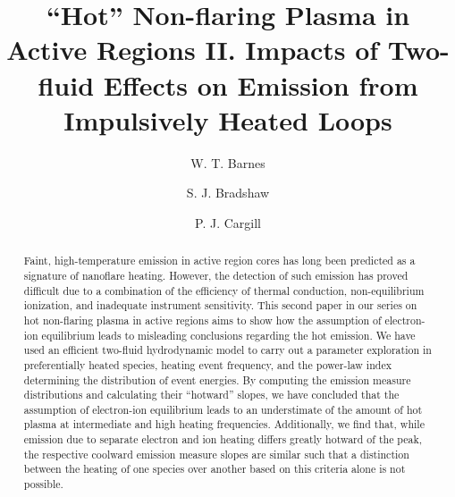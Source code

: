 \documentclass[apj]{emulateapj}
\begin{document}
	\title{``Hot'' Non-flaring Plasma in Active Regions II. Impacts of Two-fluid Effects on Emission from Impulsively Heated Loops}
	\author{W. T. Barnes}
	\author{S. J. Bradshaw}
	\author{P. J. Cargill}
	\begin{abstract}
		Faint, high-temperature emission in active region cores has long been predicted as a signature of nanoflare heating. However, the detection of such emission has proved difficult due to a combination of the efficiency of thermal conduction, non-equilibrium ionization, and inadequate instrument sensitivity. This second paper in our series on hot non-flaring plasma in active regions aims to show how the assumption of electron-ion equilibrium leads to misleading conclusions regarding the hot emission. We have used an efficient two-fluid hydrodynamic model to carry out a parameter exploration in preferentially heated species, heating event frequency, and the power-law index determining the distribution of event energies. By computing the emission measure distributions and calculating their ``hotward'' slopes, we have concluded that the assumption of electron-ion equilibrium leads to an understimate of the amount of hot plasma at intermediate and high heating frequencies. Additionally, we find that, while emission due to separate electron and ion heating differs greatly hotward of the peak, the respective coolward emission measure slopes are similar such that a distinction between the heating of one species over another based on this criteria alone is not possible. 
	\end{abstract}
\end{document}
